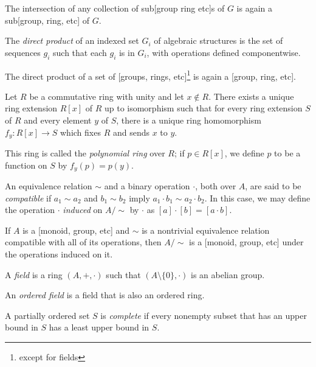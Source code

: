  \begin{prop}
      The intersection of any collection of sub[group ring etc]s of $G$ is again
      a sub[group, ring, etc] of $G$.
  \end{prop}
\begin{defn}
    The \emph{direct product} of an indexed set $G_i$ of algebraic structures is
    the set of sequences $g_i$ such that each $g_i$ is in $G_i$, with operations
    defined componentwise.
\end{defn}
\begin{prop}
    The direct product of a set of [groups, rings, etc]\footnote{except for
    fields} is again a [group, ring, etc].
\end{prop}
  \begin{prop}
      Let $R$ be a commutative ring with unity and let $x\not\in R$.
      There exists a unique ring extension $R[x]$ of $R$ up to isomorphism such
      that for every ring extension $S$ of $R$ and every element $y$ of $S$,
      there is a unique ring homomorphism $f_y:R[x]\to S$ which fixes $R$ and
      sends $x$ to $y$.
  \end{prop}
  \begin{defn}
      This ring is called the \emph{polynomial ring} over $R$; if $p\in R[x]$,
      we define $p$ to be a function on $S$ by $f_y(p)=p(y)$.
  \end{defn}
  \begin{defn}
      An equivalence relation $\sim$ and a binary operation $\cdot$, both over $A$, are said
      to be \emph{compatible} if $a_1\sim a_2$ and $b_1\sim b_2$ imply $a_1\cdot
      b_1\sim a_2\cdot b_2$. In this case, we may define the operation
      $\cdot$ \emph{induced} on $A/\sim$ by $\cdot$ as $[a]\cdot[b]=[a\cdot b]$.
  \end{defn}
  \begin{prop}
      If $A$ is a [monoid, group, etc] and $\sim$ is a nontrivial equivalence relation compatible with
      all of its operations, then $A/\sim$ is a [monoid, group, etc] under the operations
      induced on it.
  \end{prop}
  \begin{defn}
    A \emph{field} is a ring $(A,+,\cdot)$ such that $(A\setminus
    \{0\},\cdot)$ is an abelian group.

    An \emph{ordered field} is a field that is also an ordered ring.
  \end{defn}
  \begin{defn}
    A partially ordered set $S$ is \emph{complete} if every nonempty subset that has
    an upper bound in $S$ has a least upper bound in $S$.
  \end{defn}

